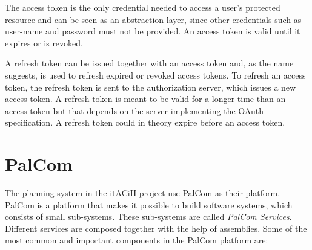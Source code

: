 \documentclass{cslthse-msc}
\begin{document}
The access token is the only credential needed to access a user's protected resource and can be seen as an abstraction layer, since other credentials such as user-name and password must not be provided. An access token is valid until it expires or is revoked.  

A refresh token can be issued together with an access token and, as the name suggests, is used to refresh expired or revoked access tokens. To refresh an access token, the refresh token is sent to the authorization server, which issues a new access token. A refresh token is meant to be valid for a longer time than an access token but that depends on the server implementing the OAuth-specification. A refresh token could in theory expire before an access token. 

\section{PalCom}
The planning system in the itACiH project use PalCom as their platform. PalCom is a platform that makes it possible to build software systems, which consists of small sub-systems\cite{ist-PalCom}. These sub-systems are called \emph{PalCom Services}. Different services are composed together with the help of assemblies. Some of the most common and important components in the PalCom platform are: 
\end{document}
